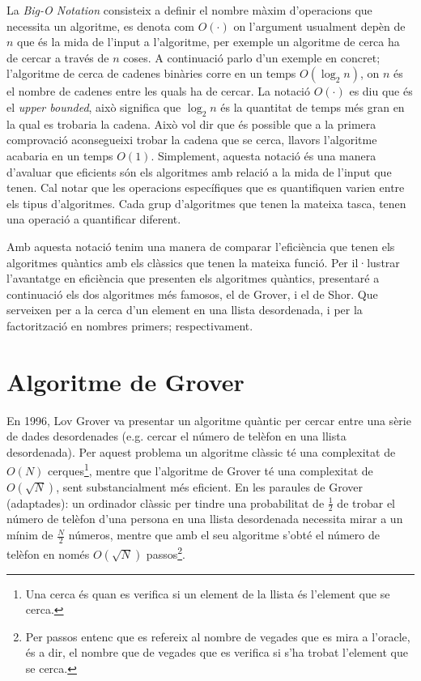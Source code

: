 La \textit{Big-O Notation} consisteix a definir el nombre màxim d'operacions que necessita un algoritme, es denota com $O(\cdot)$ on l'argument usualment depèn de $n$ que és la mida de l'input a l'algoritme, per exemple un algoritme de cerca ha de cercar a través de $n$ coses. A continuació parlo d'un exemple en concret; l'algoritme de cerca de cadenes binàries corre en un temps $O(\log_{2} n)$, on $n$ és el nombre de cadenes entre les quals ha de cercar. La notació $O(\cdot)$ es diu que és el \textit{upper bounded}, això significa que $\log_{2} n$ és la quantitat de temps més gran en la qual es trobaria la cadena. Això vol dir que és possible que a la primera comprovació aconsegueixi trobar la cadena que se cerca, llavors l'algoritme acabaria en un temps $O(1)$. Simplement, aquesta notació és una manera d'avaluar que eficients són els algoritmes amb relació a la mida de l'input que tenen. Cal notar que les operacions específiques que es quantifiquen varien entre els tipus d'algoritmes. Cada grup d'algoritmes que tenen la mateixa tasca, tenen una operació a quantificar diferent.

Amb aquesta notació tenim una manera de comparar l'eficiència que tenen els algoritmes quàntics amb els clàssics que tenen la mateixa funció. Per il·lustrar l'avantatge en eficiència que presenten els algoritmes quàntics, presentaré a continuació els dos algoritmes més famosos, el de Grover, i el de Shor. Que serveixen per a la cerca d'un element en una llista desordenada, i per la factorització en nombres primers; respectivament.

\section{Algoritme de Grover}
En 1996, Lov Grover va presentar un algoritme quàntic per cercar entre una sèrie de dades desordenades \cite{Grover_96} (e.g. cercar el número de telèfon en una llista desordenada). Per aquest problema un algoritme clàssic té una complexitat de $O(N)$ cerques\footnote{Una cerca és quan es verifica si un element de la llista és l'element que se cerca.}, mentre que l'algoritme de Grover té una complexitat de $O(\sqrt{N})$, sent substancialment més eficient. En les paraules de Grover \cite{Grover_96} (adaptades): un ordinador clàssic per tindre una probabilitat de $\frac{1}{2}$ de trobar el número de telèfon d'una persona en una llista desordenada necessita mirar a un mínim de $\frac{N}{2}$ números, mentre que amb el seu algoritme s'obté el número de telèfon en només $O(\sqrt{N})$ passos\footnote{Per passos entenc que es refereix al nombre de vegades que es mira a l'oracle, és a dir, el nombre que de vegades que es verifica si s'ha trobat l'element que se cerca.}.

